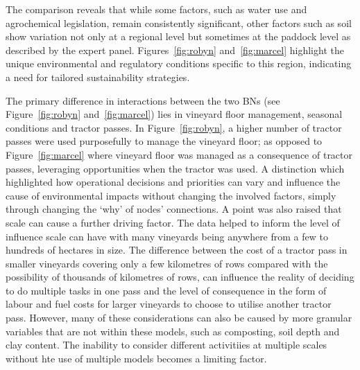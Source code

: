 \documentclass[fleqn,10pt]{wlscirep}
\begin{document}

The comparison reveals that while some factors, such as water use and agrochemical legislation, remain consistently significant, other factors such as soil show variation not only at a regional level but sometimes at the paddock level as described by the expert panel. Figures~\ref{fig:robyn} and~\ref{fig:marcel} highlight the unique environmental and regulatory conditions specific to this region, indicating a need for tailored sustainability strategies.

The primary difference in interactions between the two BNs (see Figure~\ref{fig:robyn} and~\ref{fig:marcel}) lies in vineyard floor management, seasonal conditions and tractor passes. In Figure~\ref{fig:robyn}, a higher number of tractor passes were used purposefully to manage the vineyard floor; as opposed to Figure~\ref{fig:marcel} where vineyard floor was managed as a consequence of tractor passes, leveraging opportunities when the tractor was used. A distinction which highlighted how operational decisions and priorities can vary and influence the cause of environmental impacts without changing the involved factors, simply through changing the `why' of nodes' connections. A point was also raised that scale can cause a further driving factor. The data helped to inform the level of influence scale can have with many vineyards being anywhere from a few to hundreds of hectares in size. The difference between the cost of a tractor pass in smaller vineyards covering only a few kilometres of rows compared with the possibility of thousands of kilometres of rows, can influence the reality of deciding to do multiple tasks in one pass and the level of consequence in the form of labour and fuel costs for larger vineyards to choose to utilise another tractor pass. However, many of these considerations can also be caused by more granular variables that are not within these models, such as composting, soil depth and clay content. The inability to consider different activitiies at multiple scales without hte use of multiple models becomes a limiting factor.

\end{document}
